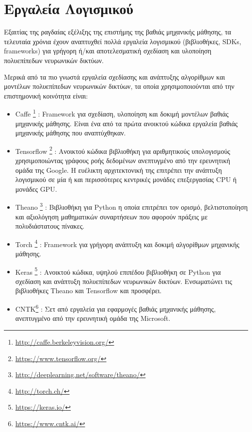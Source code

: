 \section{Εργαλεία Λογισμικού}
\label{sec:dnn_sw}

Εξαιτίας της ραγδαίας εξέλιξης της επιστήμης της βαθιάς μηχανικής μάθησης,
τα τελευταία χρόνια έχουν αναπτυχθεί πολλά εργαλεία λογισμικού (βιβλιοθήκες, SDKs, frameworks)
για γρήγορη ή/και αποτελεσματική σχεδίαση και υλοποίηση πολυεπίπεδων νευρωνικών δικτύων.

Μερικά από τα πιο γνωστά εργαλεία
σχεδίασης και ανάπτυξης αλγορίθμων και μοντέλων πολυεπίπεδων νευρωνικών δικτύων, τα οποία
χρησιμοποιούνται από την επιστημονική κοινότητα είναι:
\begin{itemize}
  \item{Caffe \footnote{\url{http://caffe.berkeleyvision.org/}} %
      \cite{jia2014caffe}:
    Framework για σχεδίαση, υλοποίηση και δοκιμή μοντέλων βαθιάς μηχανικής μάθησης.
    Είναι ένα από τα πρώτα ανοικτού κώδικα εργαλεία βαθιάς μηχανικής μάθησης που αναπτύχθηκαν.}
  \item{Tensorflow \footnote{\url{https://www.tensorflow.org/}} %
      \cite{DBLP:journals/corr/AbadiBCCDDDGIIK16}:
    Ανοικτού κώδικα βιβλιοθήκη για αριθμητικούς υπολογισμούς χρησιμοποιώντας
    γράφους ροής δεδομένων ανεπτυγμένο από την ερευνητική ομάδα της Google.
    Η ευέλικτη αρχιτεκτονική της επιτρέπει την ανάπτυξη
    λογισμικού σε μία ή και περισσότερες κεντρικές μονάδες επεξεργασίας CPU ή μονάδες GPU.}
  \item{Theano \footnote{\url{http://deeplearning.net/software/theano/}}
      \cite{2016arXiv160502688full}\cite{bergstra+al:2010-scipy}\cite{Bastien-Theano-2012}: %
      Βιβλιοθήκη για Python η οποία επιτρέπει τον ορισμό, βελτιστοποίηση και αξιολόγηση
      μαθηματικών συναρτήσεων που αφορούν πράξεις με πολυδιάστατους πίνακες.}
    \item{Torch \footnote{\url{http://torch.ch/}} %
        \cite{collobert2002torch}\cite{collobert2011torch7}\cite{collobert2012implementing}:
      Framework για γρήγορη ανάπτυξη και δοκιμή αλγορίθμων μηχανικής μάθησης.}
    \item{Keras \footnote{\url{https://keras.io/}} \cite{chollet2015keras}:
    Ανοικτού κώδικα, υψηλού επιπέδου βιβλιοθήκη σε Python για σχεδίαση και ανάπτυξη
    πολυεπίπεδων νευρωνικών δικτύων. Ενσωματώνει
    τις βιβλιοθήκες Theano και Tensorflow και προσφέρει.} %
  \item{CNTK\footnote{\url{https://www.cntk.ai/}} \cite{Seide:2016:CMO:2939672.2945397}:
    Σετ από εργαλεία για εφαρμογές βαθιάς μηχανικής μάθησης, ανεπτυγμένο από την ερευνητική ομάδα της Microsoft.}
\end{itemize}

